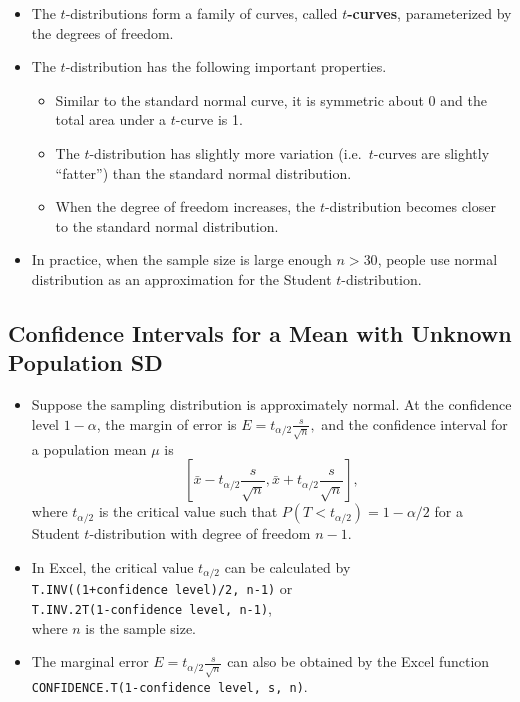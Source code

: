 \begin{itemize}
\item
  The \(t\)-distributions form a family of curves, called
  \textbf{\(t\)-curves}, parameterized by the
  degrees of freedom.
\item
  The \(t\)-distribution has the following important properties.

  \begin{itemize}
  \item
    Similar to the standard normal curve, it is symmetric about
    0 and the total area under a \(t\)-curve is
    1.
  \item
    The \(t\)-distribution has slightly more variation
    (i.e.~\(t\)-curves are slightly ``fatter'') than the
    standard normal distribution.
  \item
    When the degree of freedom increases, the
    \(t\)-distribution becomes closer to the standard normal
    distribution.
  \end{itemize}
\item
  In practice, when the sample size is large enough \(n>30\), people use
  normal distribution as an approximation for the Student
  \(t\)-distribution.
\end{itemize}

\hypertarget{confidence-intervals-for-a-mean-with-unknown-population-sd}{%
\subsection{\texorpdfstring{Confidence Intervals for a Mean with
\textbf{Unknown} Population
SD}{Confidence Intervals for a Mean with Unknown Population SD}}\label{confidence-intervals-for-a-mean-with-unknown-population-sd}}

\begin{itemize}
\item
  Suppose the sampling distribution is approximately normal. At the
  confidence level \(1-\alpha\), the margin of error is
  \(E=t_{\alpha/2}\frac{s}{\sqrt{n}},\) and the confidence interval for
  a population mean \(\mu\) is
  \[\left[\bar{x}-t_{\alpha/2}\frac{s}{\sqrt{n}}, \bar{x}+t_{\alpha/2}\frac{s}{\sqrt{n}}\right],\]
  where \(t_{\alpha/2}\) is the critical value such that
  \(P(T<t_{\alpha/2})=1-\alpha/2\) for a Student \(t\)-distribution with
  degree of freedom \(n-1\).
\item
  In Excel, the critical value \(t_{\alpha/2}\) can be calculated by\\
  \texttt{T.INV((1+confidence\ level)/2,\ n-1)} or\\
  \texttt{T.INV.2T(1-confidence\ level,\ n-1)},\\ where \(n\) is the
  sample size.
\item
  The marginal error \(E=t_{\alpha/2}\frac{s}{\sqrt{n}}\) can also be
  obtained by the Excel function\\
  \texttt{CONFIDENCE.T(1-confidence\ level,\ s,\ n)}.
\end{itemize}

